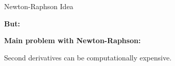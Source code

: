 \documentclass[11pt,compress,t,notes=noshow, xcolor=table]{beamer}
\begin{document}
\begin{vbframe}{Newton-Raphson Idea}




\medskip

\textbf{But:}
\begin{framed}
    \textbf{Main problem with Newton-Raphson:}
    
    \centering
    Second derivatives can be computationally expensive.
\end{framed}

\end{vbframe}
\end{document}

